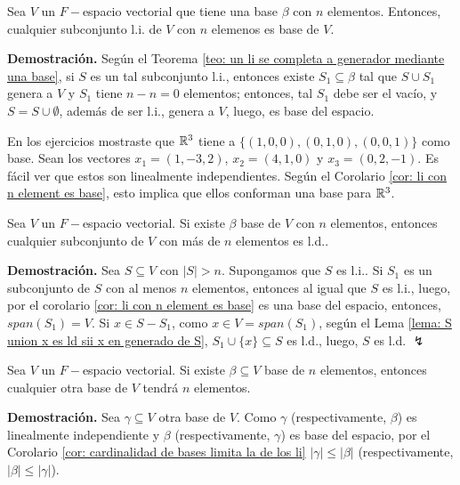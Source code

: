 \begin{cor}
	\label{cor: li con n element es base}
Sea $V$ un $F-$espacio vectorial que tiene una base
$\beta$ con $n$ elementos. Entonces, cualquier subconjunto
l.i. de $V$ con $n$ elemenos es base de $V$. 
\end{cor}
\noindent
\textbf{Demostración.}
Según el Teorema 
\ref{teo: un li se completa a generador mediante una base},
si $S$ es un tal subconjunto l.i., entonces existe $S_{1} \subseteq \beta$
tal que $S \cup S_{1}$ genera a $V$ y $S_{1}$ tiene
$n-n=0$ elementos; entonces, tal $S_{1}$ debe ser el vacío,
y $S = S \cup \emptyset$, además de ser l.i., genera a $V$,
luego, es base del espacio.

\QEDB
\vspace{0.2cm}

\begin{ejem}
En los ejercicios mostraste que $\mathbb{R}^{3}$ tiene a 
$\{ (1, 0, 0), (0, 1, 0), (0, 0, 1) \}$ como base. Sean
los vectores 
$x_{1} = (1, -3, 2)$,
$x_{2} = (4, 1, 0)$ y $x_{3} = (0, 2, -1)$. Es fácil ver que
estos son linealmente independientes. Según el Corolario
\ref{cor: li con n element es base}, esto implica que
ellos conforman una base para $\mathbb{R}^{3}$.
\end{ejem}

\begin{cor}
	\label{cor: cardinalidad de bases limita la de los li}
Sea $V$ un $F-$espacio vectorial. Si existe $\beta$ base de
$V$ con $n$ elementos, entonces cualquier subconjunto de $V$
con más de $n$ elementos es l.d..
\end{cor}
\noindent
\textbf{Demostración.}
Sea $S \subseteq V$ con $|S| > n$. Supongamos que $S$ es l.i..
Si $S_{1}$ es un subconjunto de $S$ con al menos $n$ elementos, 
entonces al igual que $S$ es l.i., luego, por el corolario 
\ref{cor: li con n element es base} es una base del espacio,
entonces,  $span(S_{1}) = V$.
Si $x \in S - S_{1}$, como $x \in V = span(S_{1})$,
según el Lema 
\ref{lema: S union x es ld sii x en generado de S},
$S_{1} \cup \{ x \} \subseteq S$ es l.d., luego,
$S$ es l.d.  $\lightning$

\QEDB
\vspace{0.2cm}

\begin{cor}
Sea $V$ un $F-$espacio vectorial. Si existe 
$\beta \subseteq V$ base de $n$ elementos, entonces
cualquier otra base de $V$ tendrá $n$ elementos.
\end{cor}
\noindent
\textbf{Demostración.}
Sea $\gamma \subseteq V$ otra base de $V$.
Como $\gamma$ (respectivamente, $\beta$) es linealmente independiente
y $\beta$ (respectivamente, $\gamma$) es base del espacio,
por el Corolario 
\ref{cor: cardinalidad de bases limita la de los li}
$|\gamma| \leq |\beta|$ (respectivamente, 
$|\beta| \leq |\gamma|$).

